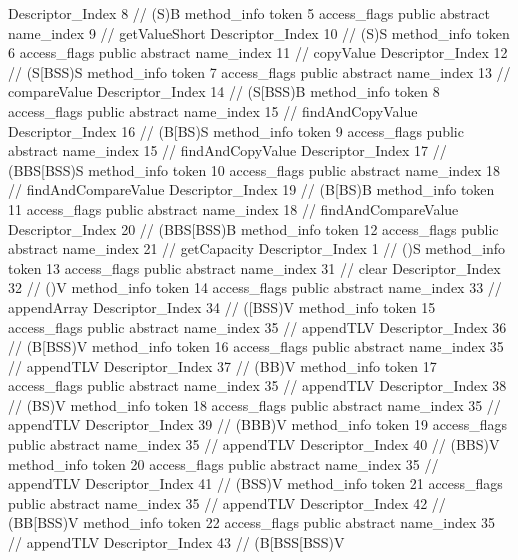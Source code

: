 {{{{{					Descriptor_Index	8		// (S)B
				}
				method_info {
					token	5
					access_flags	public abstract
					name_index	9		// getValueShort
					Descriptor_Index	10		// (S)S
				}
				method_info {
					token	6
					access_flags	public abstract
					name_index	11		// copyValue
					Descriptor_Index	12		// (S[BSS)S
				}
				method_info {
					token	7
					access_flags	public abstract
					name_index	13		// compareValue
					Descriptor_Index	14		// (S[BSS)B
				}
				method_info {
					token	8
					access_flags	public abstract
					name_index	15		// findAndCopyValue
					Descriptor_Index	16		// (B[BS)S
				}
				method_info {
					token	9
					access_flags	public abstract
					name_index	15		// findAndCopyValue
					Descriptor_Index	17		// (BBS[BSS)S
				}
				method_info {
					token	10
					access_flags	public abstract
					name_index	18		// findAndCompareValue
					Descriptor_Index	19		// (B[BS)B
				}
				method_info {
					token	11
					access_flags	public abstract
					name_index	18		// findAndCompareValue
					Descriptor_Index	20		// (BBS[BSS)B
				}
				method_info {
					token	12
					access_flags	public abstract
					name_index	21		// getCapacity
					Descriptor_Index	1		// ()S
				}
				method_info {
					token	13
					access_flags	public abstract
					name_index	31		// clear
					Descriptor_Index	32		// ()V
				}
				method_info {
					token	14
					access_flags	public abstract
					name_index	33		// appendArray
					Descriptor_Index	34		// ([BSS)V
				}
				method_info {
					token	15
					access_flags	public abstract
					name_index	35		// appendTLV
					Descriptor_Index	36		// (B[BSS)V
				}
				method_info {
					token	16
					access_flags	public abstract
					name_index	35		// appendTLV
					Descriptor_Index	37		// (BB)V
				}
				method_info {
					token	17
					access_flags	public abstract
					name_index	35		// appendTLV
					Descriptor_Index	38		// (BS)V
				}
				method_info {
					token	18
					access_flags	public abstract
					name_index	35		// appendTLV
					Descriptor_Index	39		// (BBB)V
				}
				method_info {
					token	19
					access_flags	public abstract
					name_index	35		// appendTLV
					Descriptor_Index	40		// (BBS)V
				}
				method_info {
					token	20
					access_flags	public abstract
					name_index	35		// appendTLV
					Descriptor_Index	41		// (BSS)V
				}
				method_info {
					token	21
					access_flags	public abstract
					name_index	35		// appendTLV
					Descriptor_Index	42		// (BB[BSS)V
				}
				method_info {
					token	22
					access_flags	public abstract
					name_index	35		// appendTLV
					Descriptor_Index	43		// (B[BSS[BSS)V
}}}}}
